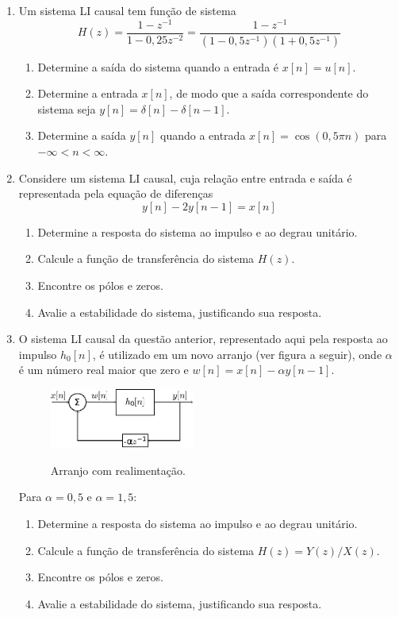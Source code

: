 \documentclass[a4paper,10pt]{article}
\begin{document}
\begin{enumerate}
	\item Um sistema LI causal tem função de sistema
		\begin{equation*}
			H(z) = \frac{1-z^{-1}}{1-0,25z^{-2}} = \frac{1-z^{-1}}{(1-0,5z^{-1})(1+0,5z^{-1})}
		\end{equation*}
		\begin{enumerate}
			\item Determine a saída do sistema quando a entrada é $x[n]=u[n]$.
			\item Determine a entrada $x[n]$, de modo que a saída correspondente do sistema seja $y[n]=\delta[n] - \delta[n-1]$.
			\item Determine a saída $y[n]$ quando a entrada $x[n] = \cos(0,5\pi n)$ para $-\infty < n< \infty$.
		\end{enumerate}

	\item  Considere um sistema LI causal, cuja relação entre entrada e saída é representada pela equação de diferenças
		\begin{equation*}
			y[n] - 2 y[n-1] = x[n]
		\end{equation*}
		\begin{enumerate}
			\item Determine a resposta do sistema ao impulso e ao degrau unitário.
			\item Calcule a função de transferência do sistema $H(z)$.
			\item Encontre os pólos e zeros.
			\item Avalie a estabilidade do sistema, justificando sua resposta.
		\end{enumerate}
	\item O sistema LI causal da questão anterior, representado aqui pela resposta ao impulso $h_0[n]$, é utilizado em um novo arranjo (ver figura a seguir), onde $\alpha$ é um número real maior que zero e $w[n]=x[n]-\alpha y[n-1]$.
		\begin{figure}[h]
			\centering
			\includegraphics[width=0.45\textwidth]{figs/arranjo}
			\label{fig:arranjo}
			\caption{Arranjo com realimentação.}
		\end{figure}

		Para $\alpha = 0,5$ e $\alpha = 1,5$:
		\begin{enumerate}
			\item Determine a resposta do sistema ao impulso e ao degrau unitário.
			\item Calcule a função de transferência do sistema $H(z)=Y(z)/X(z)$.
			\item Encontre os pólos e zeros.
			\item Avalie a estabilidade do sistema, justificando sua resposta.
		\end{enumerate}


\end{enumerate}
\end{document}
